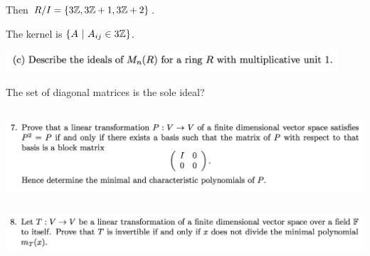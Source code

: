\documentclass[12pt]{article}
\begin{document}
Then $R/I = \{3\mathbb{Z}, 3\mathbb{Z} + 1, 3\mathbb{Z} + 2\}$.

The kernel is $\{A ~|~ A_{ij} \in 3\mathbb{Z}\}$.

\begin{mdframed}
\includegraphics[width=350pt]{img/linear-algebra-a0-1-6-c.png}\\
\end{mdframed}
The set of diagonal matrices is the sole ideal?

\newpage
\subsection*{} %
\begin{mdframed}
\includegraphics[width=400pt]{img/linear-algebra-a0-1-7.png}\\
\end{mdframed}

\subsection*{} %
\begin{mdframed}
\includegraphics[width=400pt]{img/linear-algebra-a0-1-8.png}\\
\end{mdframed}
\end{document}
